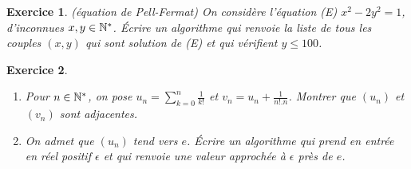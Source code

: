\documentclass[11pt,a4paper]{article}
\newtheorem{ex}{Exercice}
\begin{document}
\begin{ex}\label{eqPell-fermat}(équation de Pell-Fermat)
On considère l'équation (E) $x^2-2y^2=1$, d'inconnues $x,y\in \mathbb{N}^*$. Écrire un algorithme qui renvoie la liste de tous les couples $(x,y)$ qui sont solution de (E) et qui vérifient $y\leq 100$. 
\end{ex}




\begin{ex}\label{exSuite_e}
\begin{enumerate}
\item Pour $n\in \mathbb{N}^*$, on pose $u_n=\sum_{k=0}^n \frac{1}{k!}$ et $v_n=u_n+\frac{1}{n!.n}$. Montrer que $(u_n)$ et $(v_n)$ sont adjacentes.

\item On admet que $(u_n)$ tend vers $e$. Écrire un algorithme qui prend en entrée en réel positif $\epsilon$ et qui renvoie une valeur approchée à $\epsilon$ près de $e$. 
\end{enumerate}
\end{ex}
\end{document}
